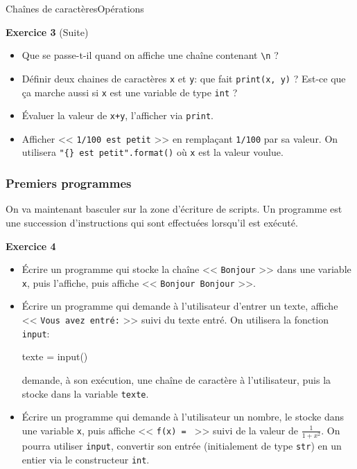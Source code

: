 \documentclass[10pt]{beamer}
\begin{document}
\begin{frame}[fragile]{Chaînes de caractères}{Opérations}


	\begin{block}{\textbf{Exercice 3} (Suite)}
    \begin{itemize}[<+->]
	
	
	\item Que se passe-t-il quand on affiche une chaîne contenant \verb|\n| ?
	
	\item Définir deux chaines de caractères \verb|x| et \verb|y|: que fait \verb|print(x, y)| ? Est-ce que ça marche aussi si \verb|x| est une variable de type \verb|int| ?
	
	\item Évaluer la valeur de \verb|x+y|, l'afficher via \verb|print|.
	
	\item Afficher << \verb|1/100 est petit| >> en remplaçant \verb|1/100| par sa valeur. On utilisera \verb|"{} est petit".format()| où \verb|x| est la valeur voulue.
	
	\end{itemize}
	\end{block}
\end{frame}

\begin{frame}[fragile]
	\frametitle{Premiers programmes}
	
	On va maintenant basculer sur la zone d'écriture de scripts. Un programme est une succession d'instructions qui sont effectuées lorsqu'il est exécuté.
	\pause
	
	\begin{block}{\textbf{Exercice 4}}
	\begin{itemize}[<+->]
	\item Écrire un programme qui stocke la chaîne << \verb|Bonjour| >> dans une variable \verb|x|, puis l'affiche, puis affiche << \verb|Bonjour Bonjour| >>.
	
	\item Écrire un programme qui demande à l'utilisateur d'entrer un texte, affiche << \verb|Vous avez entré:| >> suivi du texte entré. On utilisera la fonction \verb|input|:	\begin{semiverbatim}texte = input()\end{semiverbatim}
	demande, à son exécution, une chaîne de caractère à l'utilisateur, puis la stocke dans la variable \verb|texte|.
	
	\item Écrire un programme qui demande à l'utilisateur un nombre, le stocke dans une variable \verb|x|, puis affiche << \verb|f(x) = | >> suivi de la valeur de $\frac{1}{1+x^2}$. On pourra utiliser \verb|input|, convertir son entrée (initialement de type \verb|str|) en un entier via le constructeur \verb|int|.
	
	\end{itemize}
	\end{block}
	
\end{frame}
\end{document}
